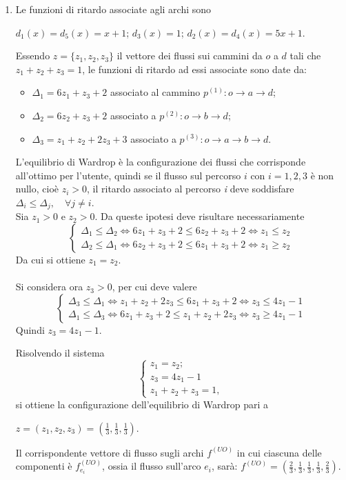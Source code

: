 \documentclass[13pt,largemargins]{homework}
\begin{document}
\begin{enumerate}[label=(\alph*)]
\item %
Le funzioni di ritardo associate agli archi sono 
\begin{center}
	$d_1(x) = d_5(x) = x+1$; \quad $d_3(x) = 1$; \quad $d_2(x) = d_4(x) = 5x+1$.
\end{center}	
Essendo $z = \{z_1, z_2, z_3\}$ il vettore dei flussi sui cammini da \(o\) a \(d\)  tali che $z_1+z_2+z_3=1$, le funzioni di ritardo ad essi associate sono date da:
\begin{itemize}
\item $\Delta_1=6z_1+z_3+2$ associato al cammino $p^{(1)}: o\rightarrow a \rightarrow d$; 
\item $\Delta_2=6z_2+z_3+2$ associato a $p^{(2)}: o\rightarrow b \rightarrow d$; 
\item $\Delta_3=z_1+z_2+2z_3+3$ associato a  $p^{(3)}: o\rightarrow a\rightarrow b \rightarrow d$.\\
\end{itemize}
L'equilibrio di Wardrop è la configurazione dei flussi che corrisponde all'ottimo per l'utente, quindi se il flusso sul percorso \(i\) con \(i = 1,2,3\) è non nullo, cioè $z_i>0$, il ritardo associato al percorso \textit{i} deve soddisfare $\Delta_i\leq\Delta_j,\quad \forall j \neq i$.\\
Sia $z_1>0$ e $z_2>0$. Da queste ipotesi deve risultare necessariamente
\[\begin{cases} \Delta_1\leq \Delta_2 \Leftrightarrow 6z_1+z_3+2\leq 6z_2+z_3+2 \Leftrightarrow z_1\leq z_2\\ 
\Delta_2\leq \Delta_1 \Leftrightarrow 6z_2+z_3+2\leq 6z_1+z_3+2 \Leftrightarrow z_1\geq z_2\end{cases}\]
Da cui si ottiene $z_1=z_2$.\\\\
Si considera ora $z_3>0$, per cui deve valere 
\[\begin{cases} \Delta_3 \leq \Delta_1 \Leftrightarrow z_1+z_2+2z_3 \leq 6z_1+z_3+2 \Leftrightarrow z_3\leq 4z_1-1 \\ \Delta_1 \leq \Delta_3 \Leftrightarrow 6z_1+z_3+2 \leq z_1+z_2+2z_3\Leftrightarrow z_3\geq 4z_1-1\end{cases}\]
Quindi $z_3=4z_1-1$.

Risolvendo il sistema 
\begin{equation}
	\begin{cases}
		z_1 = z_2; \\
		z_3 =4z_1-1 \\
		z_1+z_2+z_3=1,
	\end{cases}
\end{equation}	
si ottiene la configurazione dell'equilibrio di Wardrop pari a \begin{center}
$z=(z_1, z_2, z_3)=(\frac{1}{3}, \frac{1}{3}, \frac{1}{3})$. 
\end{center} 
Il corrispondente vettore di flusso sugli archi $f^{(UO)}$ in cui ciascuna delle componenti è $f^{(UO)}_{e_i}$, ossia il flusso sull'arco $e_i$, sarà: $f^{(UO)}=(\frac{2}{3}, \frac{1}{3}, \frac{1}{3}, \frac{1}{3}, \frac{2}{3})$.\\


\end{enumerate}
\end{document}
